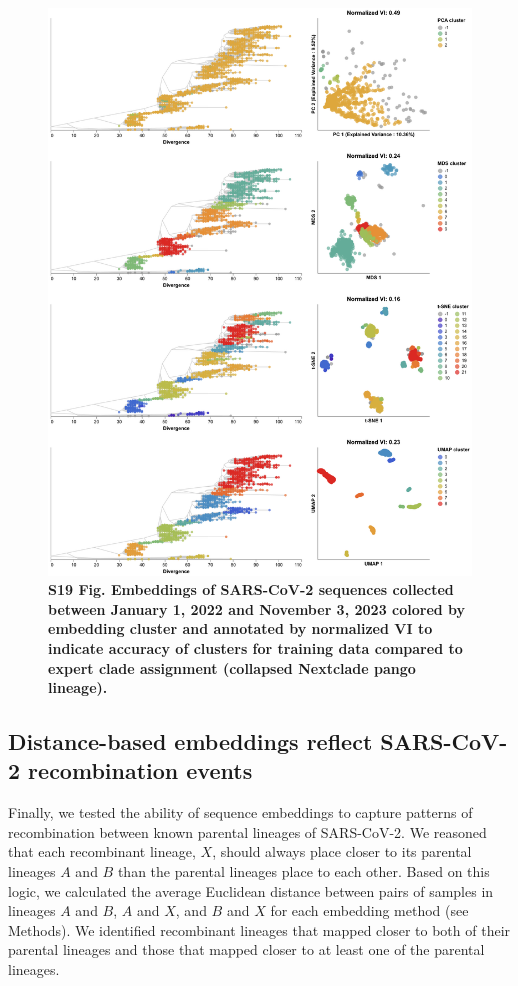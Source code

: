 \documentclass[10pt,letterpaper]{article}
\begin{document}
\begin{figure}[!h]
\includegraphics[width=\columnwidth]{figures/sarscov2-test-embeddings-by-cluster-vs-Nextclade_pango_collapsed.png}
\caption*{{\bf S19 Fig. Embeddings of SARS-CoV-2 sequences collected between January 1, 2022 and November 3, 2023 colored by embedding cluster and annotated by normalized VI to indicate accuracy of clusters for training data compared to expert clade assignment (collapsed Nextclade pango lineage).}}
\end{figure}

\subsection*{Distance-based embeddings reflect SARS-CoV-2 recombination events}

Finally, we tested the ability of sequence embeddings to capture patterns of recombination between known parental lineages of SARS-CoV-2.
We reasoned that each recombinant lineage, $X$, should always place closer to its parental lineages $A$ and $B$ than the parental lineages place to each other.
Based on this logic, we calculated the average Euclidean distance between pairs of samples in lineages $A$ and $B$, $A$ and $X$, and $B$ and $X$ for each embedding method (see Methods).
We identified recombinant lineages that mapped closer to both of their parental lineages and those that mapped closer to at least one of the parental lineages.
\end{document}

